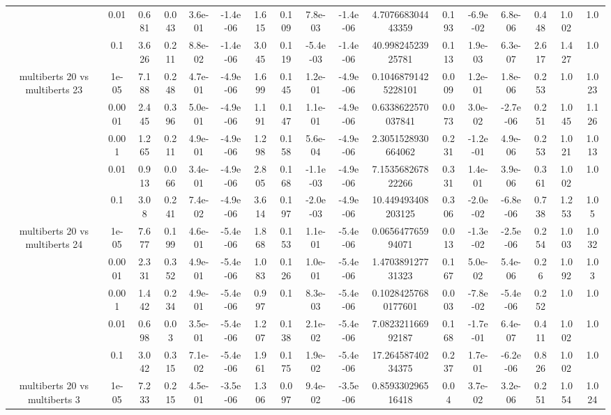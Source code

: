 \begin{tabular}{|c|c|c|c|c|c|c|c|c|c|c|c|c|c|c|c|c|}
 & 0.01 & 0.681 & 0.043 & 3.6e-01 & -1.4e-06 & 1.615 & 0.109 & 7.8e-03 & -1.4e-06 & 4.707668304443359 & 0.193 & -6.9e-02 & 6.8e-06 & 0.448 & 1.002 & 1.0 \\
 & 0.1 & 3.626 & 0.211 & 8.8e-02 & -1.4e-06 & 3.045 & 0.119 & -5.4e-03 & -1.4e-06 & 40.99824523925781 & 0.113 & 1.9e-03 & 6.3e-07 & 2.617 & 1.427 & 1.0 \\
\hline
\multirow{5}{*}{multiberts 20 vs multiberts 23} & 1e-05 & 7.188 & 0.248 & 4.7e-01 & -4.9e-06 & 1.699 & 0.145 & 1.2e-01 & -4.9e-06 & 0.10468791425228101 & 0.009 & 1.2e-01 & 1.8e-06 & 0.253 & 1.0 & 1.023 \\
 & 0.0001 & 2.445 & 0.396 & 5.0e-01 & -4.9e-06 & 1.191 & 0.147 & 1.1e-01 & -4.9e-06 & 0.6338622570037841 & 0.073 & 3.0e-02 & -2.7e-06 & 0.251 & 1.045 & 1.126 \\
 & 0.001 & 1.265 & 0.211 & 4.9e-01 & -4.9e-06 & 1.298 & 0.158 & 5.6e-04 & -4.9e-06 & 2.3051528930664062 & 0.231 & -1.2e-01 & 4.9e-06 & 0.253 & 1.021 & 1.013 \\
 & 0.01 & 0.913 & 0.066 & 3.4e-01 & -4.9e-06 & 2.805 & 0.168 & -1.1e-03 & -4.9e-06 & 7.153568267822266 & 0.331 & 1.4e-01 & 3.9e-06 & 0.361 & 1.002 & 1.0 \\
 & 0.1 & 3.08 & 0.241 & 7.4e-02 & -4.9e-06 & 3.614 & 0.197 & -2.0e-03 & -4.9e-06 & 10.449493408203125 & 0.306 & -2.0e-02 & -6.8e-06 & 0.738 & 1.253 & 1.05 \\
\hline
\multirow{5}{*}{multiberts 20 vs multiberts 24} & 1e-05 & 7.677 & 0.199 & 4.6e-01 & -5.4e-06 & 1.868 & 0.153 & 1.1e-01 & -5.4e-06 & 0.065647765994071 & 0.013 & -1.3e-02 & -2.5e-06 & 0.254 & 1.003 & 1.032 \\
 & 0.0001 & 2.331 & 0.352 & 4.9e-01 & -5.4e-06 & 1.083 & 0.126 & 1.0e-01 & -5.4e-06 & 1.470389127731323 & 0.167 & 5.0e-02 & 5.4e-06 & 0.26 & 1.092 & 1.03 \\
 & 0.001 & 1.442 & 0.234 & 4.9e-01 & -5.4e-06 & 0.997 & 0.1 & 8.3e-03 & -5.4e-06 & 0.10284257680177601 & 0.003 & -7.8e-02 & -5.4e-06 & 0.252 & 1.0 & 1.0 \\
 & 0.01 & 0.698 & 0.03 & 3.5e-01 & -5.4e-06 & 1.207 & 0.138 & 2.1e-02 & -5.4e-06 & 7.082321166992187 & 0.168 & -1.7e-01 & 6.4e-07 & 0.411 & 1.002 & 1.0 \\
 & 0.1 & 3.042 & 0.315 & 7.1e-02 & -5.4e-06 & 1.961 & 0.175 & 1.9e-02 & -5.4e-06 & 17.26458740234375 & 0.237 & 1.7e-01 & -6.2e-06 & 0.826 & 1.002 & 1.0 \\
\hline
\multirow{5}{*}{multiberts 20 vs multiberts 3} & 1e-05 & 7.233 & 0.215 & 4.5e-01 & -3.5e-06 & 1.306 & 0.097 & 9.4e-02 & -3.5e-06 & 0.859330296516418 & 0.04 & 3.7e-02 & 3.2e-06 & 0.251 & 1.054 & 1.024 \\

\end{tabular}
